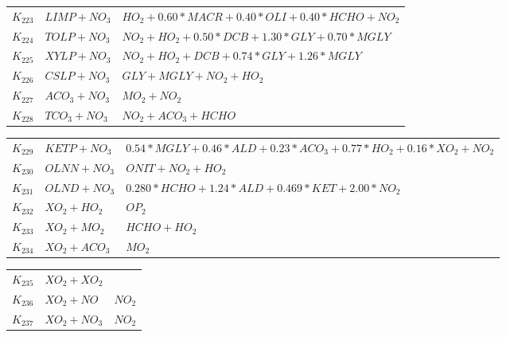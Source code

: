 {\begin{tabular}{l@{\,:\,}p{0.2\chfwidth}@{$\quad\longrightarrow\quad$}p{0.6\chfwidth}}
$K_{223}$ & $LIMP+NO_{3}$ & $HO_{2}+0.60*MACR+0.40*OLI+0.40*HCHO+NO_{2}$ \\
$K_{224}$ & $TOLP+NO_{3}$ & $NO_{2}+HO_{2}+0.50*DCB+1.30*GLY+0.70*MGLY$ \\
$K_{225}$ & $XYLP+NO_{3}$ & $NO_{2}+HO_{2}+DCB+0.74*GLY+1.26*MGLY$ \\
$K_{226}$ & $CSLP+NO_{3}$ & $GLY+MGLY+NO_{2}+HO_{2}$ \\
$K_{227}$ & $ACO_{3}+NO_{3}$ & $MO_{2}+NO_{2}$ \\
$K_{228}$ & $TCO_{3}+NO_{3}$ & $NO_{2}+ACO_{3}+HCHO$ \\
\end{tabular}

\begin{tabular}{l@{\,:\,}p{0.2\chfwidth}@{$\quad\longrightarrow\quad$}p{0.6\chfwidth}}
$K_{229}$ & $KETP+NO_{3}$ & $0.54*MGLY+0.46*ALD+0.23*ACO_{3}+0.77*HO_{2}+0.16*XO_{2}+NO_{2}$ \\
$K_{230}$ & $OLNN+NO_{3}$ & $ONIT+NO_{2}+HO_{2}$ \\
$K_{231}$ & $OLND+NO_{3}$ & $0.280*HCHO+1.24*ALD+0.469*KET+2.00*NO_{2}$ \\
$K_{232}$ & $XO_{2}+HO_{2}$ & $OP_{2}$ \\
$K_{233}$ & $XO_{2}+MO_{2}$ & $HCHO+HO_{2}$ \\
$K_{234}$ & $XO_{2}+ACO_{3}$ & $MO_{2}$ \\
\end{tabular}

\begin{tabular}{l@{\,:\,}p{0.2\chfwidth}@{$\quad\longrightarrow\quad$}p{0.6\chfwidth}}
$K_{235}$ & $XO_{2}+XO_{2}$ &  \\
$K_{236}$ & $XO_{2}+NO$ & $NO_{2}$ \\
$K_{237}$ & $XO_{2}+NO_{3}$ & $NO_{2}$
\end{tabular}
}
%
%


%
